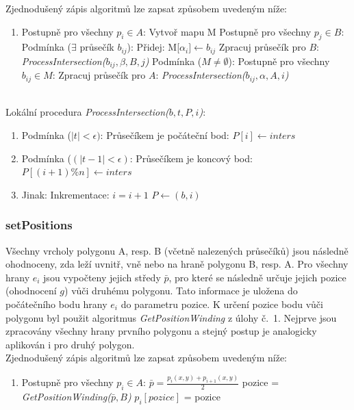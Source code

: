 \documentclass[a4paper, 12pt]{article}
\begin{document}
Zjednodušený zápis algoritmů lze zapsat způsobem uvedeným níže:

\begin{enumerate}
\item[] Postupně pro všechny $p_i \in A$:
\subitem Vytvoř mapu M 
\subitem Postupně pro všechny $p_j \in B$:
\subitem \hspace {0.5cm} Podmínka ($\exists$ průsečík $b_{ij}$):
\subitem \hspace {1cm} Přidej: M[$\alpha_{i}] \leftarrow b_{ij}$
\subitem \hspace {1cm} Zpracuj průsečík pro $B$: \textit{ProcessIntersection($b_{ij}, \beta, B, j$)}
\subitem Podmínka ($M \neq \emptyset$):
\subitem \hspace {0.5cm} Postupně pro všechny $b_{ij} \in M$:
\subitem \hspace {1cm} Zpracuj průsečík pro $A$: \textit{ProcessIntersection($b_{ij}, \alpha, A, i$)}
\end{enumerate}
~\\

Lokální procedura \textit{ProcessIntersection($b, t, P, i$)}:
\begin{enumerate}
\item  Podmínka ($|t| < \epsilon)$: 
\subitem Průsečíkem je počáteční bod: $P[i] \leftarrow inters$
\item  Podmínka ($(|t-1| < \epsilon)$:
\subitem Průsečíkem je koncový bod: $P[(i+1)\%n] \leftarrow inters$
\item  Jinak:
\subitem Inkrementace: $i = i+1$
\subitem $P \leftarrow (b,i)$
\end{enumerate}

\subsubsection{setPositions}
Všechny vrcholy polygonu A, resp. B (včetně nalezených průsečíků) jsou následně ohodnoceny, zda leží uvnitř, vně nebo na hraně polygonu B, resp. A. Pro všechny hrany $e_i$ jsou vypočteny jejich středy $\bar{p}$, pro které se následně určuje jejich pozice (ohodnocení $g$) vůči druhému polygonu. Tato informace je uložena do počátečního bodu hrany $e_i$ do parametru pozice. K určení pozice bodu vůči polygonu byl použit algoritmus \textit{GetPositionWinding} z úlohy č.~1. Nejprve jsou zpracovány všechny hrany prvního polygonu a stejný postup je analogicky aplikován i pro druhý polygon. \\

Zjednodušený zápis algoritmů lze zapsat způsobem uvedeným níže:
\begin{enumerate}
\item [] Postupně pro všechny $p_i \in A$:
\subitem $\bar{p} = \frac{p_i(x,y)+p_{i+1}(x,y)}{2}$
\subitem pozice = \textit{GetPositionWinding($\bar{p},B$)}
\subitem $p_i[pozice]$ = pozice
\end{enumerate}
\end{document}
